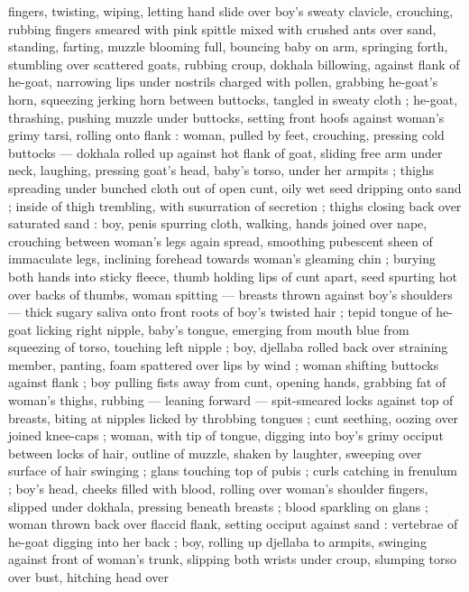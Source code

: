 fingers, twisting, wiping, letting hand slide over boy's sweaty clavicle, 
crouching, rubbing fingers smeared with pink spittle mixed with 
crushed ants over sand, standing, farting, muzzle blooming full, 
bouncing baby on arm, springing forth, stumbling over scattered 
goats, rubbing croup, dokhala billowing, against flank of he-goat, 
narrowing lips under nostrils charged with pollen, grabbing he-goat's 
horn, squeezing jerking horn between buttocks, tangled in sweaty 
cloth ; he-goat, thrashing, pushing muzzle under buttocks, setting 
front hoofs against woman's grimy tarsi, rolling onto flank : woman, 
pulled by feet, crouching, pressing cold buttocks --- dokhala rolled 
up against hot flank of goat, sliding free arm under neck, laughing, 
pressing goat's head, baby's torso, under her armpits ; thighs 
spreading under bunched cloth {\col} out of open cunt, oily wet seed 
dripping onto sand ; inside of thigh trembling, with susurration of 
secretion ; thighs closing back over saturated sand : boy, penis 
spurring cloth, walking, hands joined over nape, crouching between 
woman's legs again spread, smoothing pubescent sheen of 
immaculate legs, inclining forehead towards woman's gleaming chin 
; burying both hands into sticky fleece, thumb holding lips of cunt 
apart, seed spurting hot over backs of thumbs, woman spitting --- 
breasts thrown against boy's shoulders --- thick sugary saliva onto 
front roots of boy's twisted hair ; tepid tongue of he-goat licking 
right nipple, baby's tongue, emerging from mouth blue from 
squeezing of torso, touching left nipple ; boy, djellaba rolled back 
over straining member, panting, foam spattered over lips by wind ; 
woman shifting buttocks against flank ; boy pulling fists away from 
cunt, opening hands, grabbing fat of woman's thighs, rubbing --- 
leaning forward --- spit-smeared locks against top of breasts, biting 
at nipples licked by throbbing tongues ; cunt seething, oozing over 
joined knee-caps ; woman, with tip of tongue, digging into boy's 
grimy occiput between locks of hair, outline of muzzle, shaken by 
laughter, sweeping over surface of hair swinging ; glans touching top 
of pubis ; curls catching in frenulum ; boy's head, cheeks filled with 
blood, rolling over woman's shoulder {\col} fingers, slipped under 
dokhala, pressing beneath breasts ; blood sparkling on glans ; 
woman thrown back over flaccid flank, setting occiput against sand : 
vertebrae of he-goat digging into her back ; boy, rolling up djellaba 
to armpits, swinging against front of woman's trunk, slipping both 
wrists under croup, slumping torso over bust, hitching head over 
